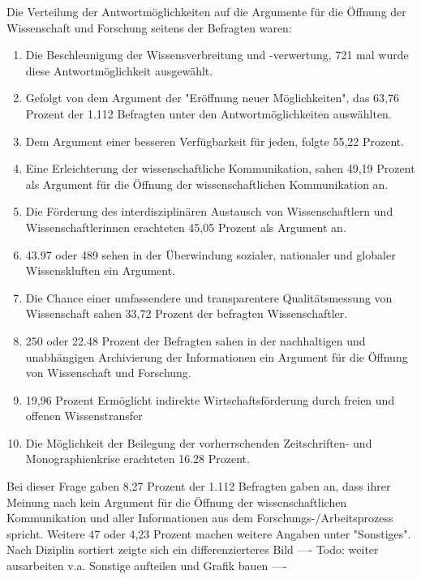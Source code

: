 Die Verteilung der Antwortmöglichkeiten auf die Argumente für die Öffnung der Wissenschaft und Forschung seitens der Befragten waren:
\begin{enumerate}
\item Die Beschleunigung der Wissensverbreitung und -verwertung, 721 mal wurde diese Antwortmöglichkeit ausgewählt.
\item Gefolgt von dem Argument der "Eröffnung neuer Möglichkeiten", das 63,76 Prozent der 1.112 Befragten unter den Antwortmöglichkeiten auswählten.
\item Dem Argument einer besseren Verfügbarkeit für jeden, folgte 55,22 Prozent.
\item Eine Erleichterung der wissenschaftliche Kommunikation, sahen 49,19 Prozent als Argument für die Öffnung der wissenschaftlichen Kommunikation an.
\item Die Förderung des interdisziplinären Austausch von Wissenschaftlern und Wissenschaftlerinnen erachteten 45,05 Prozent als Argument an. 
\item 43.97 oder 489 sehen in der Überwindung sozialer, nationaler und globaler Wissenskluften ein Argument.
\item Die Chance einer umfassendere und transparentere Qualitätsmessung von Wissenschaft sahen 33,72 Prozent der befragten Wissenschaftler.
\item 250 oder 22.48 Prozent der Befragten sahen in der nachhaltigen und unabhängigen Archivierung der Informationen ein Argument für die Öffnung von Wissenschaft und Forschung.
\item 19,96 Prozent Ermöglicht indirekte Wirtschaftsförderung durch freien und offenen Wissenstransfer
\item Die Möglichkeit der Beilegung der vorherrschenden Zeitschriften- und Monographienkrise erachteten 16.28 Prozent.
\end{enumerate}

Bei dieser Frage gaben 8,27 Prozent der 1.112 Befragten gaben an, dass ihrer Meinung nach kein Argument für die Öffnung der wissenschaftlichen Kommunikation und aller Informationen aus dem Forschungs-/Arbeitsprozess spricht. Weitere 47 oder 4,23 Prozent machen weitere Angaben unter "Sonstiges". Nach Diziplin sortiert zeigte sich ein differenzierteres Bild  ---- Todo: weiter ausarbeiten v.a. Sonstige aufteilen und Grafik bauen ----

